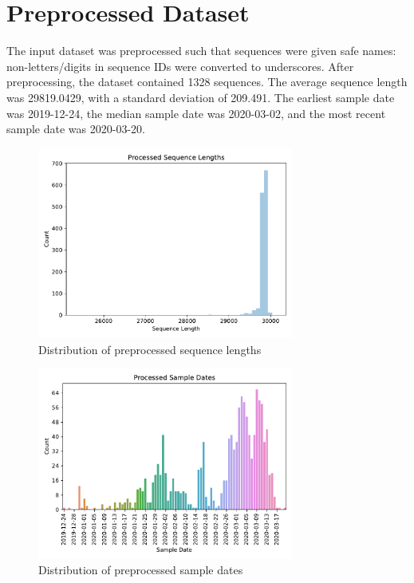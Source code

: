 \documentclass{article}
\begin{document}
\section{Preprocessed Dataset}
The input dataset was preprocessed such that sequences were given safe names: non-letters/digits in sequence IDs were converted to underscores. After preprocessing, the dataset contained 1328 sequences. The average sequence length was 29819.0429, with a standard deviation of 209.491. The earliest sample date was 2019-12-24, the median sample date was 2020-03-02, and the most recent sample date was 2020-03-20.

\begin{figure}[h]
\centering
\includegraphics[width=0.75\textwidth,keepaspectratio]{./figs/processed_sequence_lengths.pdf}
\caption{Distribution of preprocessed sequence lengths}
\end{figure}



\begin{figure}[h]
\centering
\includegraphics[width=0.75\textwidth,keepaspectratio]{./figs/processed_sample_dates.pdf}
\caption{Distribution of preprocessed sample dates}
\end{figure}
\end{document}
